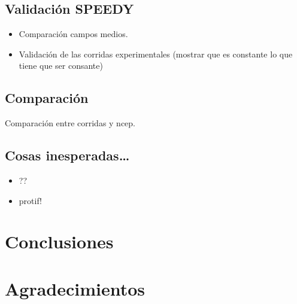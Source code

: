 \documentclass[es-AR,]{tufte-book}
\providecommand{\tightlist}{%
  \setlength{\itemsep}{0pt}\setlength{\parskip}{0pt}}
\begin{document}
\section{Validación SPEEDY}\label{validacion-speedy}

\begin{itemize}
\tightlist
\item
  Comparación campos medios.
\item
  Validación de las corridas experimentales (mostrar que es constante lo
  que tiene que ser consante)
\end{itemize}

\section{Comparación}\label{comparacion}

Comparación entre corridas y ncep.

\section{Cosas inesperadas\ldots{}}\label{cosas-inesperadas}

\begin{itemize}
\tightlist
\item
  ??
\item
  protif!
\end{itemize}

\chapter{Conclusiones}\label{conclusiones}

\chapter{Agradecimientos}\label{agradecimientos}

\renewcommand\bibname{Referencias}

\end{document}
